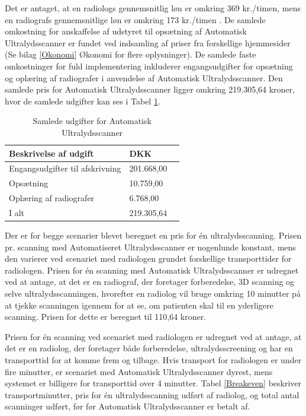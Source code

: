 Det er antaget, at en radiologs gennemsnitlig løn er omkring 369 kr./timen, mens en radiografs gennemsnitlige løn er omkring 173 kr./timen \cite{Lon}. De samlede omkostning for anskaffelse af udstyret til opsætning af Automatisk Ultralydsscanner er fundet ved indsamling af priser fra forskellige hjemmesider (Se bilag \ref{Okonomi} Økonomi for flere oplysninger). De samlede faste omkostninger for fuld implementering inkluderer engangsudgifter for opsætning og oplæring af radiografer i anvendelse af Automatisk Ultralydsscanner. Den samlede pris for Automatisk Ultralydsscanner ligger omkring 219.305,64 kroner, hvor de samlede udgifter kan ses i Tabel \ref{FasteOmkostninger}. 

\begin{table}[htb]
\centering
\begin{tabular}{ | l | l | p{} | }
\hline
\textbf{Beskrivelse af udgift} & \textbf{DKK} \\\hline
Engangsudgifter til afskrivning & 201.668,00 \\\hline
Opsætning & 10.759,00 \\\hline
Oplæring af radiografer & 6.768,00 \\\hline
I alt & 219.305,64 \\\hline
\end{tabular}
\caption{Samlede udgifter for Automatisk Ultralydsscanner}
\label{FasteOmkostninger}
\end{table}

Der er for begge scenarier blevet beregnet en pris for én ultralydsscanning. Prisen pr. scanning med Automatiseret Ultralydsscanner er nogenlunde konstant, mens den varierer ved scenariet med radiologen grundet forskellige transporttider for radiologen.  
Prisen for én scanning med Automatisk Ultralydsscanner er udregnet ved at antage, at det er en radiograf, der foretager forberedelse, 3D scanning og selve ultralydsscanningen, hvorefter en radiolog vil bruge omkring 10 minutter på at tjekke scanningen igennem for at se, om patienten skal til en yderligere scanning. Prisen for dette er beregnet til 110,64 kroner. 

Prisen for én scanning ved scenariet med radiologen er udregnet ved at antage, at det er en radiolog, der foretager både forberedelse, ultralydsscreening og har en transporttid for at komme frem og tilbage. Hvis transport for radiologen er under fire minutter, er scenariet med Automatisk Ultralydsscanner dyrest, mens systemet er billigere for transporttid over 4 minutter. Tabel \ref{Breakeven} beskriver transportminutter, pris for én ultralydsscanning udført af radiolog, og total antal scanninger udført, før før Automatisk Ultralydsscanner er betalt af. 

